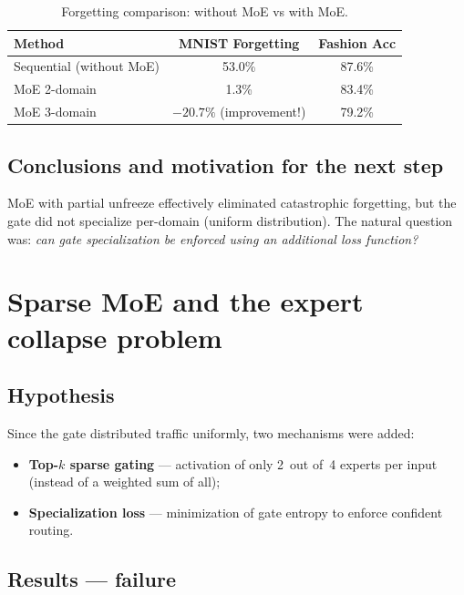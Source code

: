 \documentclass[11pt,a4paper]{report}
\begin{document}
\begin{table}[h]
\centering
\caption{Forgetting comparison: without MoE vs with MoE.}
\begin{tabular}{l c c}
\hline
\textbf{Method} & \textbf{MNIST Forgetting} & \textbf{Fashion Acc} \\
\hline
Sequential (without MoE) & 53.0\% & 87.6\% \\
MoE 2-domain & 1.3\% & 83.4\% \\
MoE 3-domain & $-20.7\%$ (improvement!) & 79.2\% \\
\hline
\end{tabular}
\end{table}

\subsection{Conclusions and motivation for the next step}

MoE with partial unfreeze effectively eliminated catastrophic forgetting, but the gate did not specialize per-domain (uniform distribution). The natural question was: \emph{can gate specialization be enforced using an additional loss function?}



\section{Sparse MoE and the expert collapse problem}
\label{sec:sparse_moe}

\subsection{Hypothesis}

Since the gate distributed traffic uniformly, two mechanisms were added:
\begin{itemize}
    \item \textbf{Top-$k$ sparse gating} --- activation of only 2~out of~4 experts per input (instead of a weighted sum of all);
    \item \textbf{Specialization loss} --- minimization of gate entropy to enforce confident routing.
\end{itemize}

\subsection{Results --- failure}
\end{document}
